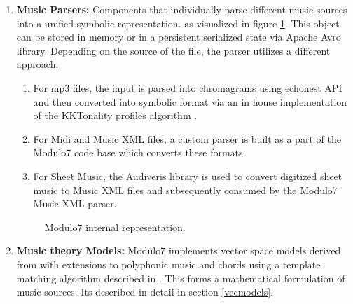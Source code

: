 \documentclass{article}
\begin{document}
\begin{enumerate}
\item \textbf{Music Parsers: } Components that individually parse different music sources into a unified symbolic representation. as visualized in figure \ref{fig:document}. This object can be stored in memory or in a persistent serialized state via Apache Avro library. Depending on the source of the file, the parser utilizes a different approach.
\begin{enumerate}
\item For mp3 files, the input is parsed into chromagrams using echonest API and then converted into symbolic format via an in house implementation of the KKTonality profiles algorithm \cite{kkTonalityKeyFinding}. 
\item For Midi and Music XML files, a custom parser is built as a part of the Modulo7 code base which converts these formats. 
\item For Sheet Music, the Audiveris library is used to convert digitized sheet music to Music XML files and subsequently consumed by the Modulo7 Music XML parser. 

\end{enumerate}

\begin{figure}[h]
\begin{center}
 {}
 \caption{Modulo7 internal representation.}
 \label{fig:document}
\end{center}
\end{figure}

\item \textbf{Music theory Models: } Modulo7 implements vector space models derived from \cite{similie} with extensions to polyphonic music and chords using a template matching algorithm described in \cite{chord-detection}. This forms a mathematical formulation of music sources. Its described in detail in section \ref{vecmodels}.


\end{enumerate}
\end{document}
